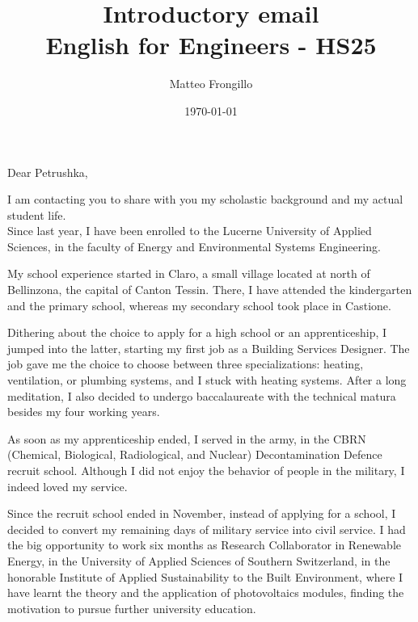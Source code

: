 \documentclass{article}
\title{\textbf{Introductory email}\\\textbf{English for Engineers - HS25}}
\author{Matteo Frongillo}
\date{\today}
\begin{document}
\maketitle

Dear Petrushka,

I am contacting you to share with you my scholastic background and my actual student life.\\
Since last year, I have been enrolled to the Lucerne University of Applied Sciences, in
the faculty of Energy and Environmental Systems Engineering. 

My school experience started in Claro, a small village located at north of Bellinzona, the
capital of Canton Tessin. There, I have attended the kindergarten and the primary school,
whereas my secondary school took place in Castione.

Dithering about the choice to apply for a high school or an apprenticeship, I jumped into
the latter, starting my first job as a Building Services Designer. The job gave me the
choice to choose between three specializations: heating, ventilation, or plumbing systems,
and I stuck with heating systems. After a long meditation, I also decided to undergo
baccalaureate with the technical matura besides my four working years.

As soon as my apprenticeship ended, I served in the army, in the CBRN
(Chemical, Biological, Radiological, and Nuclear) Decontamination Defence recruit school.
Although I did not enjoy the behavior of people in the military, I indeed loved my service.

Since the recruit school ended in November, instead of applying for a school, I decided to
convert my remaining days of military service into civil service.
I had the big opportunity to work six months as Research Collaborator in Renewable Energy,
in the University of Applied Sciences of Southern Switzerland, in the honorable Institute
of Applied Sustainability to the Built Environment, where I have learnt the theory and the
application of photovoltaics modules, finding the motivation to pursue further university
education.

\end{document}
